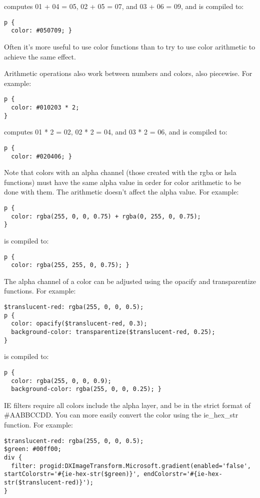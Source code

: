 \documentclass[10pt]{article}
\begin{document}
 computes 01 + 04 = 05, 02 + 05 = 07, and 03 + 06 = 09, and is compiled to:
\begin{verbatim}
p {
  color: #050709; }
\end{verbatim}


 Often it’s more useful to use color functions than to try to use color arithmetic to achieve the same effect.


 Arithmetic operations also work between numbers and colors, also piecewise. For example:
\begin{verbatim}
p {
  color: #010203 * 2;
}
\end{verbatim}


 computes 01 * 2 = 02, 02 * 2 = 04, and 03 * 2 = 06, and is compiled to:
\begin{verbatim}
p {
  color: #020406; }
\end{verbatim}


 Note that colors with an alpha channel (those created with the rgba or hsla functions) must have the same alpha value in order for color arithmetic to be done with them. The arithmetic doesn’t affect the alpha value. For example:
\begin{verbatim}
p {
  color: rgba(255, 0, 0, 0.75) + rgba(0, 255, 0, 0.75);
}
\end{verbatim}


 is compiled to:
\begin{verbatim}
p {
  color: rgba(255, 255, 0, 0.75); }
\end{verbatim}


 The alpha channel of a color can be adjusted using the opacify and transparentize functions. For example:
\begin{verbatim}
$translucent-red: rgba(255, 0, 0, 0.5);
p {
  color: opacify($translucent-red, 0.3);
  background-color: transparentize($translucent-red, 0.25);
}
\end{verbatim}


 is compiled to:
\begin{verbatim}
p {
  color: rgba(255, 0, 0, 0.9);
  background-color: rgba(255, 0, 0, 0.25); }
\end{verbatim}


 IE filters require all colors include the alpha layer, and be in the strict format of \#AABBCCDD. You can more easily convert the color using the ie\_hex\_str function. For example:
\begin{verbatim}
$translucent-red: rgba(255, 0, 0, 0.5);
$green: #00ff00;
div {
  filter: progid:DXImageTransform.Microsoft.gradient(enabled='false', startColorstr='#{ie-hex-str($green)}', endColorstr='#{ie-hex-str($translucent-red)}');
}
\end{verbatim}
\end{document}
